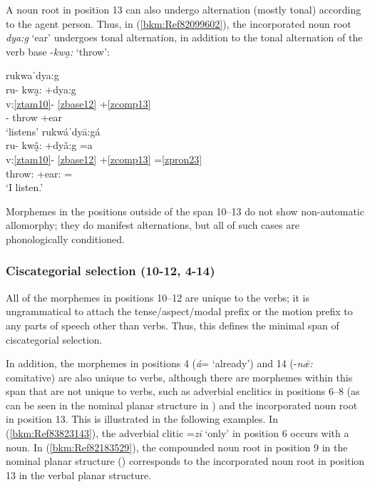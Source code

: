 \documentclass[output=paper]{langscibook}
\begin{document}
A noun root in position 13 can also undergo alternation (mostly tonal) according to the agent person. Thus, in (\ref{bkm:Ref82099602}), the incorporated noun root \textit{dya:g} `ear' undergoes tonal alternation, in addition to the tonal alternation of the verb base -\textit{kwa̰:} `throw':

\ea\label{ex:key:zap:44}
{rukwaˈdya:g}\\
\glll ru- kwa̰: +dya:g\\
v:\ref{ztam10}- \ref{zbase12} +\ref{zcomp13}\\
\Hab{}- throw +ear\\
\glt `listens'
\ex\label{bkm:Ref82099602}
{rukwáˈdyā:gá}\\
\glll ru- kwâ̰: +dyǎ:g =a\\
v:\ref{ztam10}- \ref{zbase12} {}+\ref{zcomp13} =\ref{zpron23} \\
\Hab{} throw:\First\Sg{} \textsc{+}ear:\First\Sg{} =\First\Sg{}  \\ 
\glt `I listen.'
\z

Morphemes in the positions outside of the span 10--13 do not show non-au\-to\-mat\-ic allomorphy; they do manifest alternations, but all of such cases are phonologically conditioned.  

\subsubsection{Ciscategorial selection (10-12, 4-14)}

All of the morphemes in positions 10--12 are unique to the verbs; it is ungrammatical to attach the tense/aspect/modal prefix or the motion prefix to any parts of speech other than verbs. Thus, this defines the minimal span of ciscategorial selection. 

In addition, the morphemes in positions 4 (\textit{á}= `already') and 14 (-\textit{n\={æ}:} comitative) are also unique to verbs, although there are morphemes within this span that are not unique to verbs, such as adverbial enclitics in positions 6--8 (as can be seen in the nominal planar structure in ) and the incorporated noun root in position 13. This is illustrated in the following examples. In (\ref{bkm:Ref83823143}), the adverbial clitic =\textit{zī} `only' in position 6 occurs with a noun. In (\ref{bkm:Ref82183529}), the compounded noun root in position 9 in the nominal planar structure () corresponds to the incorporated noun root in position 13 in the verbal planar structure.
\end{document}
